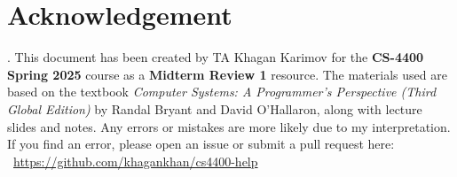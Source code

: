 \section{Acknowledgement}.
\label{sec:ack}
%
This document has been created by TA Khagan Karimov for the \textbf{CS-4400 Spring 2025} 
course as a \textbf{Midterm Review 1} resource. The materials used are based on the 
textbook \textit{Computer Systems: A Programmer's Perspective (Third Global Edition)} 
by Randal Bryant and David O'Hallaron, along with lecture slides and notes. Any errors 
or mistakes are more likely due to my interpretation. If you find an error, please open 
an issue or submit a pull request here: 
%
\noindent~\url{https://github.com/khagankhan/cs4400-help}
%